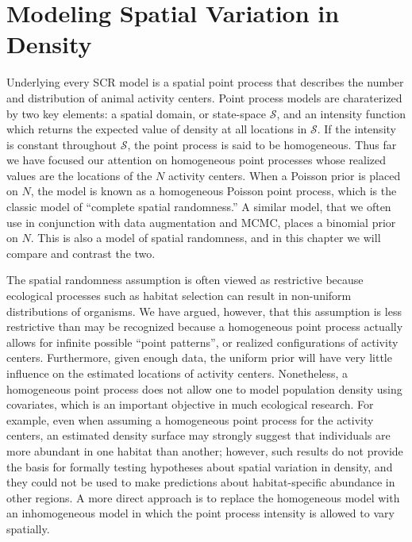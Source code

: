 \chapter{
Modeling Spatial Variation in Density
}
\label{chapt.state-space}

\vspace{0.3cm}

Underlying every SCR model is a spatial point process
that describes the number and distribution of animal activity
centers. Point process models are charaterized by two key
elements: a spatial domain, or state-space $\mathcal{S}$, and an
intensity function which returns the
expected value of density at all locations in $\mathcal{S}$.
If the intensity is constant throughout $\mathcal{S}$,
the point process is said to be homogeneous.
Thus far we have focused our attention on homogeneous %
point processes whose realized values are the locations of the $N$
activity centers. When a Poisson prior is
placed on $N$, the model is known as a homogeneous Poisson point process, which
is the classic model of ``complete spatial randomness.''
A similar model, that we often use in conjunction with data
augmentation and MCMC, places a binomial prior on $N$. This is also a
model of spatial randomness, and in this chapter we will compare and
contrast the two.

The spatial randomness assumption is often viewed as restrictive
because ecological processes such as
habitat selection can result in non-uniform
distributions of organisms. We have argued, however, that this
assumption is less restrictive than may be recognized because a
homogeneous point process actually allows for infinite
possible ``point patterns'', or realized configurations of activity
centers. Furthermore, given enough data,
the uniform prior will have very little influence on the estimated
locations of activity centers. Nonetheless, a homogeneous point
process does not allow one to model population density using
covariates, which is an important objective in much ecological research.
For example, even when assuming a homogeneous point process for
the activity centers, an estimated density surface may strongly
suggest that individuals are more abundant in one habitat than
another; however, such results do not provide the basis for formally testing
hypotheses about spatial variation in density, and they could not be
used to make predictions about habitat-specific abundance in other
regions. A more direct approach is to replace the homogeneous model
with an inhomogeneous model in which the point process intensity
is allowed to vary spatially.

